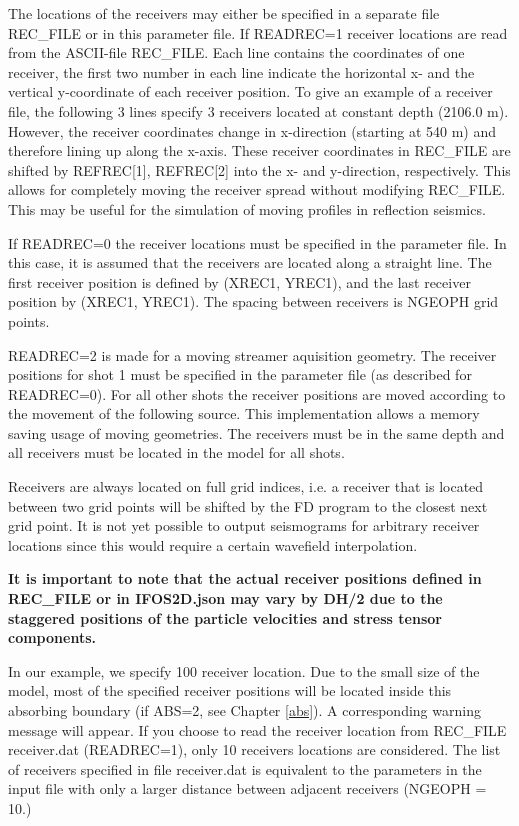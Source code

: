 The locations of the receivers may either be specified in a separate file REC\_FILE or in this parameter file. If READREC=1 receiver locations are read from the ASCII-file REC\_FILE. Each line contains the coordinates of one receiver, the first two number in each line indicate the horizontal x- and the vertical y-coordinate of each receiver position. To give an example of a receiver file, the following 3 lines specify 3 receivers located at constant depth (2106.0 m). However, the receiver coordinates change in x-direction (starting at 540 m) and therefore lining up along the x-axis. 
{\color{blue}{\begin{verbatim}
540.0   2106.0
1080.0  2106.0
1620.0  2106.0
\end{verbatim}}}
These receiver coordinates in REC\_FILE are shifted by REFREC[1], REFREC[2] into the  x- and y-direction, respectively. This allows for completely moving the receiver spread without modifying REC\_FILE. This may be useful for the simulation of moving profiles in reflection seismics.

If READREC=0 the receiver locations must be specified in the parameter file. In this case, it is assumed that the receivers are located along a straight line. The first receiver position is defined by (XREC1, YREC1), and the last receiver position by (XREC1, YREC1). The spacing between receivers is NGEOPH grid points.

READREC=2 is made for a moving streamer aquisition geometry. The receiver positions for shot 1 must be specified in the parameter file (as described for READREC=0). For all other shots the receiver positions are moved according to the movement of the following source. This implementation allows a memory saving usage of moving geometries. The receivers must be in the same depth and all receivers must be located in the model for all shots.

Receivers are always located on full grid indices, i.e. a receiver that is located between two grid points will be shifted by the FD program to the closest next grid point. It is not yet possible
to output seismograms for arbitrary receiver locations since this would require a certain wavefield interpolation.

\textbf{It is important to note that the actual receiver positions defined in REC\_FILE or in IFOS2D.json may vary by DH/2 due to the staggered positions of the particle velocities and stress tensor components. }

In our example, we specify 100 receiver location. Due to the small size of the model, most of the specified receiver positions will be located inside this absorbing boundary (if ABS=2, see Chapter \ref{abs}). A corresponding warning message will appear. If you choose to read the receiver location from REC\_FILE receiver.dat (READREC=1), only 10 receivers locations are considered. The list of receivers specified in file receiver.dat is equivalent to the parameters in the input file with only a larger distance between adjacent receivers (NGEOPH = 10.)



